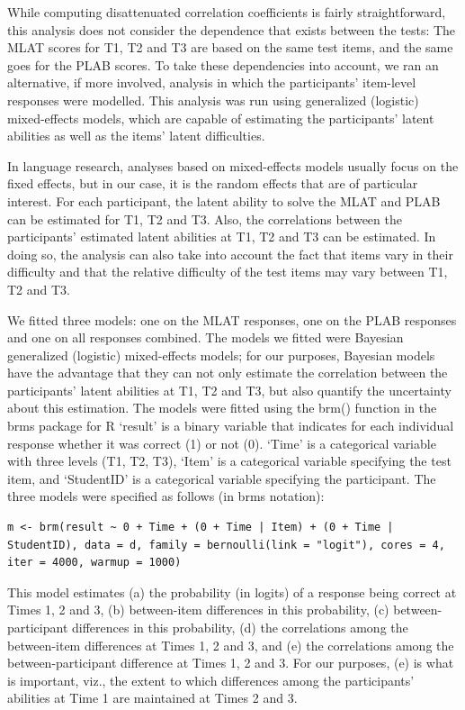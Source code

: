 \documentclass[output=paper]{langsci/langscibook}
\begin{document}
While computing disattenuated correlation coefficients is fairly straightforward, this analysis does not consider the dependence that exists between the tests: The MLAT scores for T1, T2 and T3 are based on the same test items, and the same goes for the PLAB scores. To take these dependencies into account, we ran an alternative, if more involved, analysis in which the participants’ item-level responses were modelled. This analysis was run using generalized (logistic) mixed-effects models, which are capable of estimating the participants’ latent abilities as well as the items’ latent difficulties.

In language research, analyses based on mixed-effects models usually focus on the fixed effects, but in our case, it is the random effects that are of particular interest. For each participant, the latent ability to solve the MLAT and PLAB can be estimated for T1, T2 and T3. Also, the correlations between the participants’ estimated latent abilities at T1, T2 and T3 can be estimated. In doing so, the analysis can also take into account the fact that items vary in their difficulty and that the relative difficulty of the test items may vary between T1, T2 and T3. 

We fitted three models: one on the MLAT responses, one on the PLAB responses and one on all responses combined. The models we fitted were Bayesian generalized (logistic) mixed-effects models; for our purposes, Bayesian models have the advantage that they can not only estimate the correlation between the participants’ latent abilities at T1, T2 and T3, but also quantify the uncertainty about this estimation. The models were fitted using the brm() function in the brms package for R \citep{Buerkner2017} ‘result’ is a binary variable that indicates for each individual response whether it was correct (1) or not (0). ‘Time’ is a categorical variable with three levels (T1, T2, T3), ‘Item’ is a categorical variable specifying the test item, and ‘StudentID’ is a categorical variable specifying the participant. The three models were specified as follows (in brms notation):

\begin{lstlisting}
m <- brm(result ~ 0 + Time + (0 + Time | Item) + (0 + Time | StudentID), data = d, family = bernoulli(link = "logit"), cores = 4, iter = 4000, warmup = 1000)
\end{lstlisting}

This model estimates (a) the probability (in logits) of a response being correct at Times 1, 2 and 3, (b) between-item differences in this probability, (c) between-participant differences in this probability, (d) the correlations among the between-item differences at Times 1, 2 and 3, and (e) the correlations among the between-participant difference at Times 1, 2 and 3. For our purposes, (e) is what is important, viz., the extent to which differences among the participants’ abilities at Time 1 are maintained at Times 2 and 3.
\end{document}
